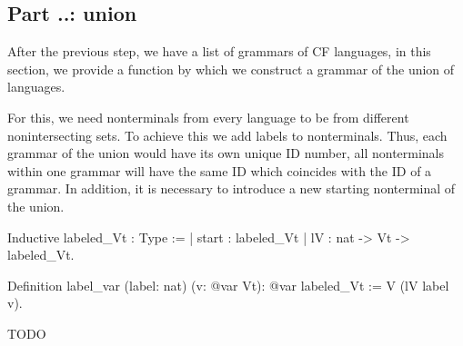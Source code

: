 





\subsection{Part ..: union}

After the previous step, we have a list of grammars of CF languages, in this section, we provide a function by which we construct a grammar of the union of languages.

For this, we need nonterminals from every language to be from different nonintersecting sets. To achieve this we add labels to nonterminals. Thus, each grammar of the union would have its own unique ID number, all nonterminals within one grammar will have the same ID which coincides with the ID of a grammar. In addition, it is necessary to introduce a new starting nonterminal of the union.

\begin{listing}[h]
    \begin{pyglist}[language=coq, numbers=none, numbersep=5pt]
  Inductive labeled_Vt : Type :=
  | start : labeled_Vt
  | lV : nat -> Vt -> labeled_Vt.
  
  Definition label_var (label: nat) 
                       (v: @var Vt): @var 
                       labeled_Vt :=
    V (lV label v).  
    \end{pyglist}
    \caption{TODO}
    \label{lst:verbments1}
\end{listing}

